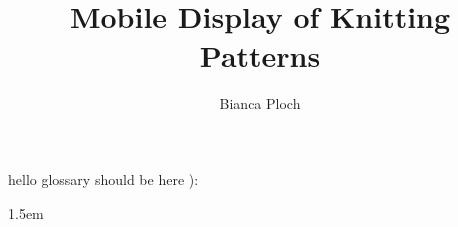\author{Bianca Ploch}
\title{Mobile Display of Knitting Patterns}




\makeglossaries




% 






\newpage
hello glossary should be here ):
\printglossary[type=\acronymtype,title={Abbreviations}]

\newpage 
\sloppy %
\emergencystretch 1.5em %
\listoffigures

\newpage
\lstlistoflistings

\printbibliography


%    

\newpage
\thispagestyle{empty}

